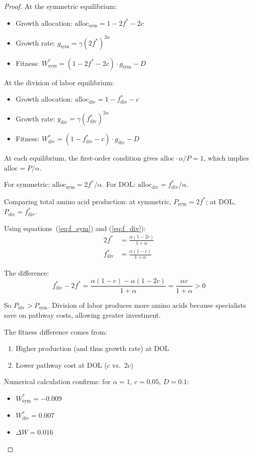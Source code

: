 \documentclass[11pt]{article}
\theoremstyle{definition}
\begin{document}
\begin{proof}
At the symmetric equilibrium:
\begin{itemize}
\item Growth allocation: $\text{alloc}_{\text{sym}} = 1 - 2f^* - 2c$
\item Growth rate: $g_{\text{sym}} = \gamma (2f^*)^{2\alpha}$
\item Fitness: $W^*_{\text{sym}} = (1 - 2f^* - 2c) \cdot g_{\text{sym}} - D$
\end{itemize}

At the division of labor equilibrium:
\begin{itemize}
\item Growth allocation: $\text{alloc}_{\text{div}} = 1 - f^*_{\text{div}} - c$
\item Growth rate: $g_{\text{div}} = \gamma (f^*_{\text{div}})^{2\alpha}$
\item Fitness: $W^*_{\text{div}} = (1 - f^*_{\text{div}} - c) \cdot g_{\text{div}} - D$
\end{itemize}

At each equilibrium, the first-order condition gives $\text{alloc} \cdot \alpha / P = 1$, which implies $\text{alloc} = P / \alpha$.

For symmetric: $\text{alloc}_{\text{sym}} = 2f^* / \alpha$.
For DOL: $\text{alloc}_{\text{div}} = f^*_{\text{div}} / \alpha$.

Comparing total amino acid production: at symmetric, $P_{\text{sym}} = 2f^*$; at DOL, $P_{\text{div}} = f^*_{\text{div}}$.

Using equations~(\ref{eq:f_sym}) and (\ref{eq:f_div}):
\begin{align}
2f^* &= \frac{\alpha(1 - 2c)}{1 + \alpha} \\
f^*_{\text{div}} &= \frac{\alpha(1 - c)}{1 + \alpha}
\end{align}

The difference:
\begin{equation}
f^*_{\text{div}} - 2f^* = \frac{\alpha(1 - c) - \alpha(1 - 2c)}{1 + \alpha} = \frac{\alpha c}{1 + \alpha} > 0
\end{equation}

So $P_{\text{div}} > P_{\text{sym}}$. Division of labor produces more amino acids because specialists save on pathway costs, allowing greater investment.

The fitness difference comes from:
\begin{enumerate}
\item Higher production (and thus growth rate) at DOL
\item Lower pathway cost at DOL ($c$ vs.\ $2c$)
\end{enumerate}

Numerical calculation confirms: for $\alpha = 1$, $c = 0.05$, $D = 0.1$:
\begin{itemize}
\item $W^*_{\text{sym}} = -0.009$
\item $W^*_{\text{div}} = 0.007$
\item $\Delta W = 0.016$
\end{itemize}
\end{proof}
\end{document}
